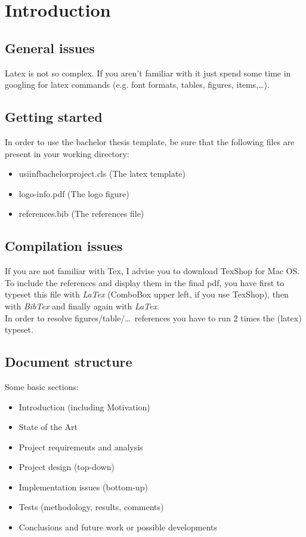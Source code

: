 \section{Introduction} \label{introduction}

\subsection{General issues}

Latex is not so complex. If you aren't familiar with it just spend some time in googling for latex commands (e.g. font formats, tables, figures, items,\dots).

\subsection{Getting started}
In order to use the bachelor thesis template, be sure that the following files are present in your working directory:
\begin{itemize}
\item usiinfbachelorproject.cls (The latex template)
\item logo-info.pdf (The logo figure)
\item references.bib (The references file)\\
\end{itemize}

\subsection {Compilation issues}

If you are not familiar with Tex, I advise you to download TexShop for Mac OS.\\
To include the references and display them in the final pdf, you have first to typeset this file with \textit{LaTex} (ComboBox upper left, if you use TexShop), then with \textit{BibTex} and finally again with \textit{LaTex}.\\
In order to resolve figures/table/\dots~references you have to run 2 times the (latex) typeset.

\subsection {Document structure}

Some basic sections:
\begin{itemize}
\item Introduction (including Motivation)
\item State of the Art
\item Project requirements and analysis
\item Project design (top-down)
\item Implementation issues (bottom-up)
\item Tests (methodology, results, comments)
\item Conclusions and future work or possible developments
\end{itemize} 

